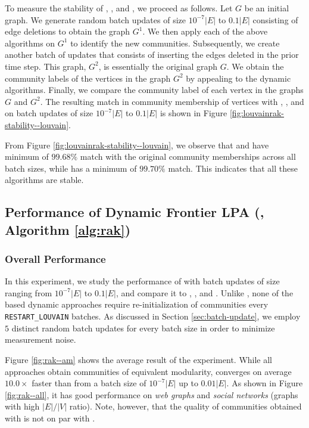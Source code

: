 To measure the stability of \NaiLou{}, \DelLou{}, and \FroLou{}, we proceed as follows. Let $G$ be an initial graph. We generate random batch updates of size $10^{-7} |E|$ to $0.1 |E|$ consisting of edge deletions to obtain the graph $G^1$. We then apply each of the above algorithms on $G^1$ to identify the new communities. Subsequently, we create another batch of updates that consists of inserting the edges deleted in the prior time step. This graph, $G^2$, is essentially the original graph $G$. We obtain the community labels of the vertices in the graph $G^2$ by appealing to the dynamic algorithms. Finally, we compare the community label of each vertex in the graphs $G$ and $G^2$. The resulting match in community membership of vertices with \NaiLou{}, \DelLou{}, and \FroLou{} on batch updates of size $10^{-7} |E|$ to $0.1 |E|$ is shown in Figure \ref{fig:louvainrak-stability--louvain}.

From Figure \ref{fig:louvainrak-stability--louvain}, we observe that\NaiLou{} and \DelLou{} have minimum of $99.68\%$ match with the original community memberships across all batch sizes, while \FroLou{} has a minimum of $99.70\%$ match. This indicates that all these algorithms are stable.







\subsection{Performance of Dynamic Frontier LPA (\FroLPA{}, Algorithm \ref{alg:rak})}
\label{sec:rak-evaluation}

\subsubsection{Overall Performance}

In this experiment, we study the performance of \FroLPA{} with batch updates of size ranging from $10^{-7} |E|$ to $0.1 |E|$, and compare it to \StaLPA{}, \NaiLPA{}, and \DelLPA{}. Unlike \Lou{}, none of the \LPA{} based dynamic approaches require re-initialization of communities every \verb|RESTART_LOUVAIN| batches. As discussed in Section \ref{sec:batch-update}, we employ $5$ distinct random batch updates for every batch size in order to minimize measurement noise.

Figure \ref{fig:rak--am} shows the average result of the experiment. While all approaches obtain communities of equivalent modularity, \FroLPA{} converges on average $10.0\times$ faster than \NaiLPA{} from a batch size of $10^{-7} |E|$ up to $0.01 |E|$. As shown in Figure \ref{fig:rak--all}, it has good performance on \textit{web graphs} and \textit{social networks} (graphs with high $|E|/|V|$ ratio). Note, however, that the quality of communities obtained with \LPA{} is not on par with \Lou{}.

